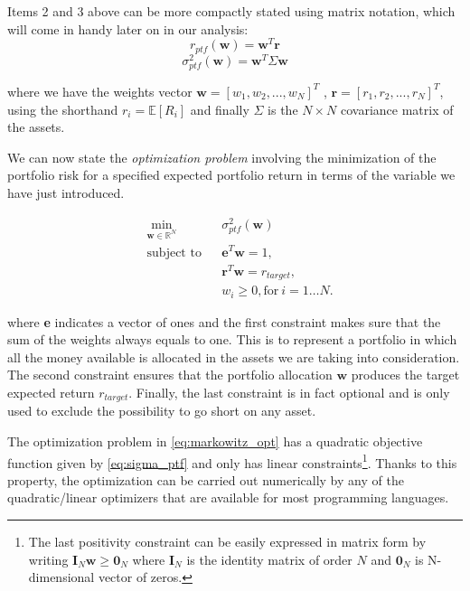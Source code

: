 Items 2 and 3 above can be more compactly stated using matrix notation, which will come in handy later on in our analysis:
\begin{equation}
\label{eq:ptf_return}
r_{ptf}(\mathbf{w}) = \mathbf{w}^T \mathbf{r}
\end{equation}
\begin{equation}
\label{eq:sigma_ptf}
	\sigma^2_{ptf}(\mathbf{w}) =  \mathbf{w}^T \Sigma \mathbf{w}
\end{equation}

where we have the weights vector $\mathbf{w} = [w_1, w_2, ... , w_N]^T$ , $\mathbf{r} = [r_1, r_2, ... , r_N]^T$, using the shorthand $r_i = \mathbb{E}[R_i]$ and finally $\Sigma$ is the $N\times N$ covariance matrix of the assets.

\bigskip

We can now state the \textit{optimization problem} involving the minimization of the portfolio risk for a specified expected portfolio return in terms of the variable we have just introduced.

\begin{subequations}
	\label{eq:markowitz_opt}
	\begin{align}
	&\!\min_{\mathbf{w}\in \mathbb{R}^{N}}     &    & \sigma^2_{ptf}(\mathbf{w}) \\
	& \text{subject to}   &   & \mathbf{e}^T\mathbf{w} = 1 ,\\
	&                 &       & \mathbf{r}^T\mathbf{w} = r_{target},\label{eq:constraint2} \\
	&		   &      & w_{i} \geq 0, \text{for} \: i = 1\dots N. 
	\end{align}
\end{subequations}

where \textbf{e} indicates a vector of ones and the first constraint makes sure that the sum of the weights always equals to one. This is to represent a portfolio in which all the money available is allocated in the assets we are taking into consideration.
The second constraint ensures that the portfolio allocation $\mathbf{w}$ produces the target expected return $r_{target}$.
Finally, the last constraint is in fact optional and is only used to exclude the possibility to go short on any asset.

The optimization problem in \eqref{eq:markowitz_opt} has a quadratic objective function given by \eqref{eq:sigma_ptf} and only has linear constraints\footnote{The last positivity constraint can be easily expressed in matrix form by writing $ \mathbf{I}_N\mathbf{w} \geq \mathbf{0}_N$ where $\mathbf{I}_N$ is the identity matrix of order $N$ and $\mathbf{0}_N$ is N-dimensional vector of zeros.}. Thanks to this property, the optimization can be carried out numerically by any of the quadratic/linear optimizers that are available for most programming languages.

